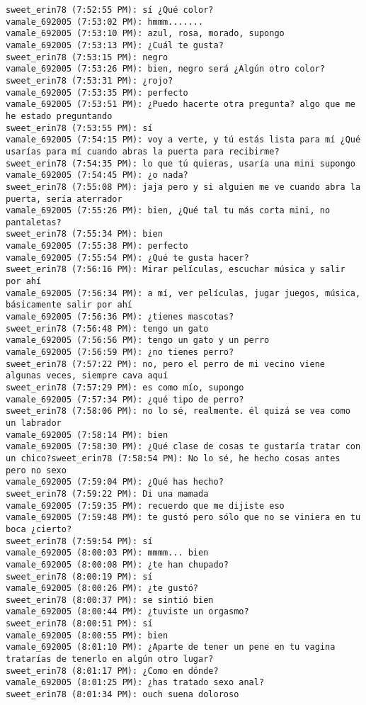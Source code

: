 \begin{verbatim}
sweet_erin78 (7:52:55 PM): sí ¿Qué color?
vamale_692005 (7:53:02 PM): hmmm.......
vamale_692005 (7:53:10 PM): azul, rosa, morado, supongo
vamale_692005 (7:53:13 PM): ¿Cuál te gusta?
sweet_erin78 (7:53:15 PM): negro
vamale_692005 (7:53:26 PM): bien, negro será ¿Algún otro color?
sweet_erin78 (7:53:31 PM): ¿rojo?
vamale_692005 (7:53:35 PM): perfecto
vamale_692005 (7:53:51 PM): ¿Puedo hacerte otra pregunta? algo que me he estado preguntando
sweet_erin78 (7:53:55 PM): sí
vamale_692005 (7:54:15 PM): voy a verte, y tú estás lista para mí ¿Qué usarías para mí cuando abras la puerta para recibirme?
sweet_erin78 (7:54:35 PM): lo que tú quieras, usaría una mini supongo
vamale_692005 (7:54:45 PM): ¿o nada?
sweet_erin78 (7:55:08 PM): jaja pero y si alguien me ve cuando abra la puerta, sería aterrador
vamale_692005 (7:55:26 PM): bien, ¿Qué tal tu más corta mini, no pantaletas?
sweet_erin78 (7:55:34 PM): bien
vamale_692005 (7:55:38 PM): perfecto
vamale_692005 (7:55:54 PM): ¿Qué te gusta hacer?
sweet_erin78 (7:56:16 PM): Mirar películas, escuchar música y salir por ahí
vamale_692005 (7:56:34 PM): a mí, ver películas, jugar juegos, música, básicamente salir por ahí
vamale_692005 (7:56:36 PM): ¿tienes mascotas?
sweet_erin78 (7:56:48 PM): tengo un gato
vamale_692005 (7:56:56 PM): tengo un gato y un perro
vamale_692005 (7:56:59 PM): ¿no tienes perro?
sweet_erin78 (7:57:22 PM): no, pero el perro de mi vecino viene algunas veces, siempre cava aquí
sweet_erin78 (7:57:29 PM): es como mío, supongo
vamale_692005 (7:57:34 PM): ¿qué tipo de perro?
sweet_erin78 (7:58:06 PM): no lo sé, realmente. él quizá se vea como un labrador
vamale_692005 (7:58:14 PM): bien
vamale_692005 (7:58:30 PM): ¿Qué clase de cosas te gustaría tratar con un chico?sweet_erin78 (7:58:54 PM): No lo sé, he hecho cosas antes pero no sexo
vamale_692005 (7:59:04 PM): ¿Qué has hecho?
sweet_erin78 (7:59:22 PM): Di una mamada
vamale_692005 (7:59:35 PM): recuerdo que me dijiste eso
vamale_692005 (7:59:48 PM): te gustó pero sólo que no se viniera en tu boca ¿cierto?              
sweet_erin78 (7:59:54 PM): sí
vamale_692005 (8:00:03 PM): mmmm... bien
vamale_692005 (8:00:08 PM): ¿te han chupado?
sweet_erin78 (8:00:19 PM): sí
vamale_692005 (8:00:26 PM): ¿te gustó?
sweet_erin78 (8:00:37 PM): se sintió bien
vamale_692005 (8:00:44 PM): ¿tuviste un orgasmo? 
sweet_erin78 (8:00:51 PM): sí
vamale_692005 (8:00:55 PM): bien
vamale_692005 (8:01:10 PM): ¿Aparte de tener un pene en tu vagina  tratarías de tenerlo en algún otro lugar?
sweet_erin78 (8:01:17 PM): ¿Como en dónde?
vamale_692005 (8:01:25 PM): ¿has tratado sexo anal?
sweet_erin78 (8:01:34 PM): ouch suena doloroso

\end{verbatim}
